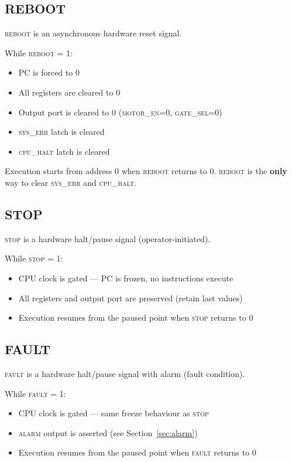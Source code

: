 \documentclass[11pt,a4paper]{article}
\newcommand{\signal}[1]{\textsc{#1}}
\begin{document}
\subsection{REBOOT}

\signal{reboot} is an asynchronous hardware reset signal.

While \signal{reboot} = 1:
\begin{itemize}[nosep]
  \item PC is forced to 0
  \item All registers are cleared to 0
  \item Output port is cleared to 0 (\signal{motor\_en}=0, \signal{gate\_sel}=0)
  \item \signal{sys\_err} latch is cleared
  \item \signal{cpu\_halt} latch is cleared
\end{itemize}

Execution starts from address 0 when \signal{reboot} returns to 0. \signal{reboot} is the \textbf{only} way to clear \signal{sys\_err} and \signal{cpu\_halt}.

\subsection{STOP}

\signal{stop} is a hardware halt/pause signal (operator-initiated).

While \signal{stop} = 1:
\begin{itemize}[nosep]
  \item CPU clock is gated --- PC is frozen, no instructions execute
  \item All registers and output port are preserved (retain last values)
  \item Execution resumes from the paused point when \signal{stop} returns to 0
\end{itemize}

\subsection{FAULT}

\signal{fault} is a hardware halt/pause signal with alarm (fault condition).

While \signal{fault} = 1:
\begin{itemize}[nosep]
  \item CPU clock is gated --- same freeze behaviour as \signal{stop}
  \item \signal{alarm} output is asserted (see Section~\ref{sec:alarm})
  \item Execution resumes from the paused point when \signal{fault} returns to 0
\end{itemize}
\end{document}
